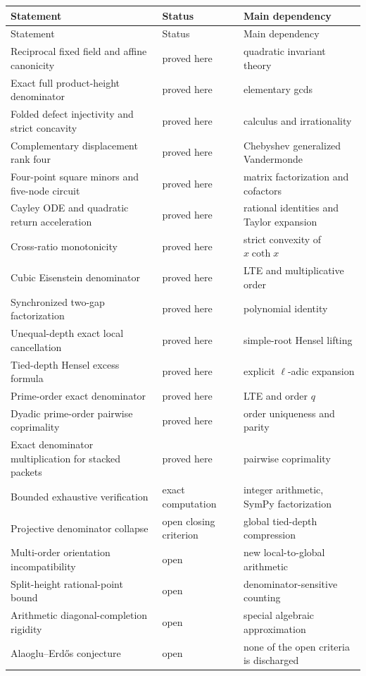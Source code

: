 \documentclass[11pt]{article}
\theoremstyle{definition}
\theoremstyle{remark}
\begin{document}
\begin{longtable}{@{}p{}p{}p{}@{}}
\toprule
Statement & Status & Main dependency\\
\midrule
\endfirsthead
\toprule
Statement & Status & Main dependency\\
\midrule
\endhead
Reciprocal fixed field and affine canonicity & proved here & quadratic invariant theory\\
Exact full product-height denominator & proved here & elementary gcds\\
Folded defect injectivity and strict concavity & proved here & calculus and irrationality\\
Complementary displacement rank four & proved here & Chebyshev generalized Vandermonde\\
Four-point square minors and five-node circuit & proved here & matrix factorization and cofactors\\
Cayley ODE and quadratic return acceleration & proved here & rational identities and Taylor expansion\\
Cross-ratio monotonicity & proved here & strict convexity of $x\coth x$\\
Cubic Eisenstein denominator & proved here & LTE and multiplicative order\\
Synchronized two-gap factorization & proved here & polynomial identity\\
Unequal-depth exact local cancellation & proved here & simple-root Hensel lifting\\
Tied-depth Hensel excess formula & proved here & explicit $\ell$-adic expansion\\
Prime-order exact denominator & proved here & LTE and order $q$\\
Dyadic prime-order pairwise coprimality & proved here & order uniqueness and parity\\
Exact denominator multiplication for stacked packets & proved here & pairwise coprimality\\
Bounded exhaustive verification & exact computation & integer arithmetic, SymPy factorization\\
Projective denominator collapse & open closing criterion & global tied-depth compression\\
Multi-order orientation incompatibility & open & new local-to-global arithmetic\\
Split-height rational-point bound & open & denominator-sensitive counting\\
Arithmetic diagonal-completion rigidity & open & special algebraic approximation\\
Alaoglu--Erd\H{o}s conjecture & open & none of the open criteria is discharged\\
\bottomrule
\end{longtable}
\end{document}
